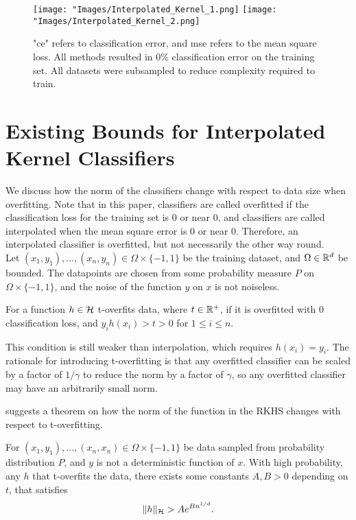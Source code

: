 \documentclass[twoside]{memoir}
\begin{document}
\begin{figure}
	\centering
	\texttt{[image: "Images/Interpolated\_Kernel\_1.png]}
	\texttt{[image: "Images/Interpolated\_Kernel\_2.png]}
	\par
	\caption{"ce" refers to classification error, and mse refers to the mean square loss. All methods resulted in 0\% classification error on the training set. All datasets were subsampled to reduce complexity required to train.} \label{fig:Interpolated_Kernel}
\end{figure}

\section{Existing Bounds for Interpolated Kernel Classifiers} \label{sec:BoundsKernel}
We discuss how the norm of the classifiers change with respect to data size when overfitting. Note that in this paper, classifiers are called overfitted if the classification loss for the training set is 0 or near 0, and classifiers are called interpolated when the mean square error is 0 or near 0. Therefore, an interpolated classifier is overfitted, but not necessarily the other way round.\\
Let $(x_1, y_1),..., (x_n, y_n) \in \Omega \times \{-1, 1\}$ be the training dataset, and $\Omega \in \mathbb{R}^d$ be bounded. The datapoints are chosen from some probability measure $P$ on $\Omega \times \{-1, 1\}$, and the noise of the function $y$ on $x$ is not noiseless.
\begin{defn}
	For a function $h \in \mathcal{H}$ t-overfits data, where $t \in \mathbb{R}^+$, if it is overfitted with 0 classification loss, and $y_ih(x_i) > t > 0$ for $1\leq i \leq n$.
\end{defn}
This condition is still weaker than interpolation, which requires $h(x_i) = y_i$. The rationale for introducing t-overfitting is that any overfitted classifier can be scaled by a factor of $1/\gamma$ to reduce the norm by a factor of $\gamma$, so any overfitted classifier may have an arbitrarily small norm.

\cite{UnderstandKernel} suggests a theorem on how the norm of the function in the RKHS changes with respect to t-overfitting.
\begin{thm} \label{thm:normBound}
	For $(x_1 ,y_1),..., (x_n,x_n) \in \Omega \times \{-1, 1\}$ be data sampled from probability distribution $P$, and $y$ is not a deterministic function of $x$. With high probability, any $h$ that t-overfits the data, there exists some constants  $A, B > 0$ depending on $t$, that satisfies
	\[\lVert h\rVert_{\mathcal{H}} > Ae^{Bn^{1/d}}. \]
\end{thm}
\end{document}
